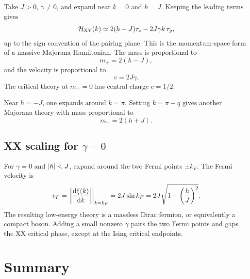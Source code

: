 Take $J>0$, $\gamma\neq0$, and expand near $k=0$ and $h=J$.  Keeping the leading
terms gives
\begin{equation}
\label{eq:xy-mother-majorana-expansion-h-plus}
    \mathcal{H}_{\rm XY}(k)
    \simeq
    2(h-J)\tau_z
    -2J\gamma k\,\tau_y,
\end{equation}
up to the sign convention of the pairing plane.  This is the momentum-space form
of a massive Majorana Hamiltonian.  The mass is proportional to
\begin{equation}
\label{eq:xy-mother-majorana-mass-h-plus}
    m_+=2(h-J),
\end{equation}
and the velocity is proportional to
\begin{equation}
    v=2J\gamma.
\end{equation}
The critical theory at $m_+=0$ has central charge $c=1/2$.

Near $h=-J$, one expands around $k=\pi$.  Setting $k=\pi+q$ gives another
Majorana theory with mass proportional to
\begin{equation}
\label{eq:xy-mother-majorana-mass-h-minus}
    m_-=2(h+J).
\end{equation}

\subsection*{XX scaling for $\gamma=0$}

For $\gamma=0$ and $\left|h\right|<J$, expand around the two Fermi points
$\pm k_F$.  The Fermi velocity is
\begin{equation}
\label{eq:xy-mother-xx-fermi-velocity}
    v_F
    =
    \left.\left|\frac{\mathrm{d} \xi(k)}{\mathrm{d} k}\right|\right|_{k=k_F}
    =
    2J\sin k_F
    =
    2J\sqrt{1-\left(\frac{h}{J}\right)^2}.
\end{equation}
The resulting low-energy theory is a massless Dirac fermion, or equivalently a
compact boson.  Adding a small nonzero $\gamma$ pairs the two Fermi points and
gaps the XX critical phase, except at the Ising critical endpoints.

\section{Summary}
\label{sec:xy-mother-summary}

